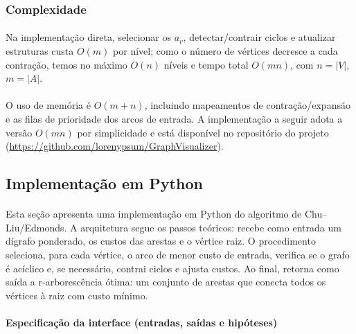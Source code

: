 \documentclass[12pt,a4paper]{article}
\begin{document}
\subsubsection{Complexidade}
\paragraph{}
Na implementação direta, selecionar os \(a_v\), detectar/contrair ciclos e atualizar estruturas custa \(O(m)\) por nível; como o número de vértices decresce a cada contração, temos no máximo \(O(n)\) níveis e tempo total \(O(mn)\), com \(n=|V|\), \(m=|A|\).


\paragraph{}
O uso de memória é \(O(m+n)\), incluindo mapeamentos de contração/expansão e as filas de prioridade dos arcos de entrada. A implementação a seguir adota a versão \(O(mn)\) por simplicidade e está disponível no repositório do projeto (\url{https://github.com/lorenypsum/GraphVisualizer}).

\subsection{Implementação em Python}

\paragraph{}
Esta seção apresenta uma implementação em Python do algoritmo de Chu–Liu/Edmonds. A arquitetura segue os passos teóricos: recebe como entrada um dígrafo ponderado, os custos das arestas e o vértice raiz. O procedimento seleciona, para cada vértice, o arco de menor custo de entrada, verifica se o grafo é acíclico e, se necessário, contrai ciclos e ajusta custos. Ao final, retorna como saída a r-arborescência ótima: um conjunto de arestas que conecta todos os vértices à raiz com custo mínimo.

\paragraph{Especificação da interface (entradas, saídas e hipóteses)}
\end{document}

